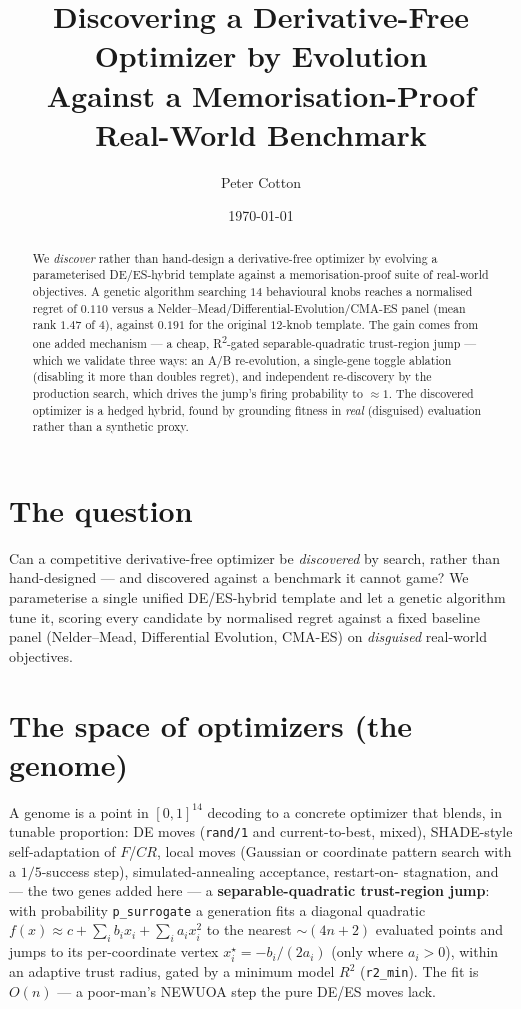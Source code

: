 \documentclass[11pt]{article}
\title{Discovering a Derivative-Free Optimizer by Evolution\\
Against a Memorisation-Proof Real-World Benchmark}
\author{Peter Cotton}
\date{\today}
\begin{document}
\maketitle

\begin{abstract}
We \emph{discover} rather than hand-design a derivative-free optimizer by evolving a
parameterised DE/ES-hybrid template against a memorisation-proof suite of real-world
objectives. A genetic algorithm searching $14$ behavioural knobs reaches a
normalised regret of $0.110$ versus a Nelder--Mead/Differential-Evolution/CMA-ES
panel (mean rank $1.47$ of $4$), against $0.191$ for the original $12$-knob template.
The gain comes from one added mechanism --- a cheap, R\textsuperscript{2}-gated
separable-quadratic trust-region jump --- which we validate three ways: an A/B
re-evolution, a single-gene toggle ablation (disabling it more than doubles regret),
and independent re-discovery by the production search, which drives the jump's firing
probability to $\approx\!1$. The discovered optimizer is a hedged hybrid, found by
grounding fitness in \emph{real} (disguised) evaluation rather than a synthetic proxy.
\end{abstract}

\section{The question}

Can a competitive derivative-free optimizer be \emph{discovered} by search, rather
than hand-designed --- and discovered against a benchmark it cannot game? We
parameterise a single unified DE/ES-hybrid template and let a genetic algorithm tune
it, scoring every candidate by normalised regret against a fixed baseline panel
(Nelder--Mead, Differential Evolution, CMA-ES) on \emph{disguised} real-world
objectives.

\section{The space of optimizers (the genome)}

A genome is a point in $[0,1]^{14}$ decoding to a concrete optimizer that blends, in
tunable proportion: DE moves (\texttt{rand/1} and current-to-best, mixed),
SHADE-style self-adaptation of $F$/$CR$, local moves (Gaussian or coordinate pattern
search with a $1/5$-success step), simulated-annealing acceptance, restart-on-
stagnation, and --- the two genes added here --- a \textbf{separable-quadratic
trust-region jump}: with probability \texttt{p\_surrogate} a generation fits a
diagonal quadratic $f(x)\approx c+\sum_i b_i x_i+\sum_i a_i x_i^2$ to the nearest
$\sim\!(4n{+}2)$ evaluated points and jumps to its per-coordinate vertex
$x_i^\star=-b_i/(2a_i)$ (only where $a_i>0$), within an adaptive trust radius, gated
by a minimum model $R^2$ (\texttt{r2\_min}). The fit is $O(n)$ --- a poor-man's
NEWUOA step the pure DE/ES moves lack.
\end{document}
